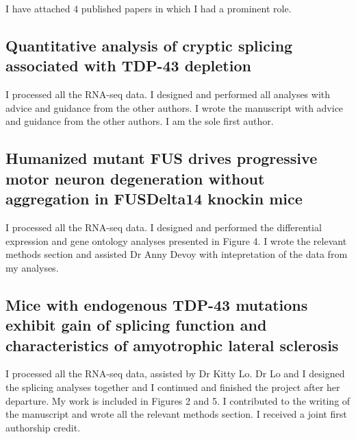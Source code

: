 \begin{appendices}
I have attached 4 published papers in which I had a prominent role.


\subsection*{Quantitative analysis of cryptic splicing associated with TDP-43 depletion}

I processed all the RNA-seq data. I designed and performed all analyses with advice and guidance from the other authors. I wrote the manuscript with advice and guidance from the other authors. I am the sole first author.



\subsection*{Humanized mutant FUS drives progressive motor neuron degeneration without aggregation in FUSDelta14 knockin mice}

I processed all the RNA-seq data. I designed and performed the differential expression and gene ontology analyses presented in Figure 4. I wrote the relevant methods section and assisted Dr Anny Devoy with intepretation of the data from my analyses.



\subsection*{Mice with endogenous TDP-43 mutations exhibit gain of splicing function and characteristics of amyotrophic lateral sclerosis}

I processed all the RNA-seq data, assisted by Dr Kitty Lo. Dr Lo and I designed the splicing analyses together and I continued and finished the project after her departure. My work is included in Figures 2 and 5. I contributed to the writing of the manuscript and wrote all the relevant methods section. I received a joint first authorship credit.



%
%

\end{appendices}
